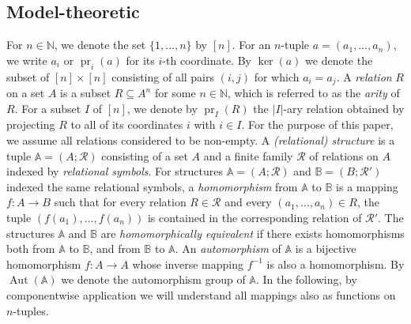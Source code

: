 \documentclass[a4paper,reqno, cleveref]{amsart}
\newcommand{\N}{\mathbb{N}}
\newcommand{\br}[1]{[#1]}
\DeclareMathOperator{\pr}{pr}
\DeclareMathOperator{\Aut}{Aut}
\newcommand{\sA}{\mathbb A}
\newcommand{\sB}{\mathbb B}
\begin{document}
\subsection{Model-theoretic}\label{sect:modeltheor} For $n\in \N$, we denote the set $\{1, \dots, n\}$ by $\br n$. For an $n$-tuple $a=(a_1, \dots, a_n)$, we write $a_i$ or $\pr_i(a)$ for its $i$-th coordinate. By $\ker(a)$ we denote the subset of $\br{n}\times \br n$ consisting of all pairs $(i,j)$ for which $a_i=a_j$. 
A \emph{relation} $R$ on a set $A$ is  a subset $R \subseteq A^n$ for some $n \in \N$, which is referred to as the \emph{arity} of $R$.  For a subset $I$ of $\br n$, we denote by $\pr_I(R)$ the $|I|$-ary relation obtained by projecting $R$ to all of its coordinates $i$ with $i \in I$. %
For the purpose of this paper, we assume all relations considered to be non-empty. 
A \emph{(relational) structure}  is a tuple $\sA=(A; \mathcal{ R}) $ consisting of a set $A$ and a finite family 
$\mathcal{R}$ of relations on $A$ indexed by \emph{relational  symbols}. 
For structures $\sA=(A; \mathcal R)$ and $\sB=(B; \mathcal R')$ indexed the same relational symbols, a \emph{homomorphism} from $\sA$ to $\sB$ is a mapping $f:A\to B$ such that for every relation $R\in \mathcal R$ and every $(a_1, \dots, a_n) \in R$, the tuple $(f(a_1), \dots, f(a_n))$ is contained in the corresponding relation of $\mathcal R'$. The structures $\sA$ and $\sB$ are \emph{homomorphically equivalent}  if
there exists homomorphisms both from $\sA$ to $\sB$, and from $\sB$ to $\sA$. An \emph{automorphism} of $\sA$ is a bijective homomorphism $f: A \to A$ 
whose inverse mapping $f^{-1}$ is also a homomorphism. By $\Aut(\sA)$ we denote the automorphism group of $\sA$. In the following, by componentwise application we will understand all mappings also as functions on $n$-tuples. 
\end{document}
